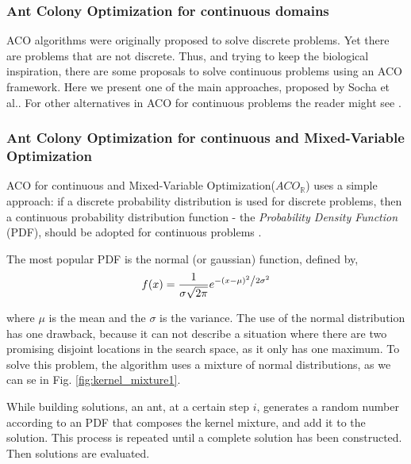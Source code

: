					\subsubsection*{Ant Colony Optimization for continuous domains}
					ACO algorithms were originally proposed to solve discrete problems. Yet there are problems that are not discrete. Thus, and trying to keep the biological inspiration, there are some proposals to solve continuous problems using an ACO framework. 
					Here we present one of the main approaches, proposed by Socha et al.\cite{socha04}. For other alternatives in ACO for continuous problems the reader might see \cite{bilchev95, kong06, tsutsui04}.
					
					
					\subsubsection*{Ant Colony Optimization for continuous and Mixed-Variable Optimization}
					 ACO for continuous and Mixed-Variable Optimization($ACO_\mathbb{R}$) uses a simple approach: if a discrete probability distribution is used for discrete problems, then a continuous probability distribution function - the \emph{Probability Density Function} (PDF), should be adopted for continuous problems \cite{socha04}.

					The most popular PDF is the normal (or gaussian) function, defined by,
						\begin{equation}
							f(x) = \frac{1}{{\sigma \sqrt {2\pi } }}e^{{{ - \left( {x - \mu } \right)^2 } \mathord{\left/ 				{\vphantom {{ - \left( {x - \mu } \right)^2 } {2\sigma ^2 }}} \right. \kern-\nulldelimiterspace} {2\sigma ^2 }}}
						\end{equation}

					\noindent where $\mu$ is the mean and the $\sigma$ is the variance. The use of the normal distribution has one drawback, because it can not describe a situation where there are two promising disjoint locations in the search space, as it only has one maximum. To solve this problem, the algorithm uses a mixture of normal distributions, as we can se in Fig. \ref{fig:kernel_mixture1}. 
					
						
						While building solutions, an ant, at a certain step $i$, generates a random number according to an PDF that composes the kernel mixture, and add it to the solution. This process is repeated until a complete solution has been constructed. Then solutions are evaluated.
						

